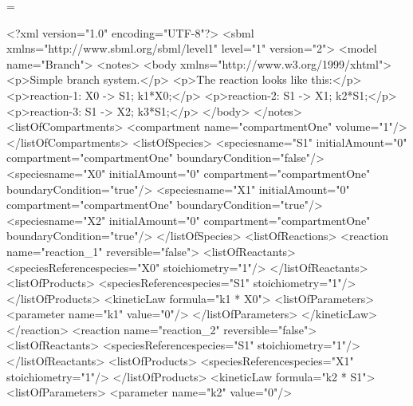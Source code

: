 \documentclass[10pt]{cekarticle}
\makeatletter
\let\realnormalsize=\normalsize
\def\liih@math{\ifmmode$\else\bad@math\fi}
\def\adjustnormalsize{\def\normalsize{\mathsurround=0pt \realnormalsize
 \parindent=0pt\abovedisplayskip=0pt\belowdisplayskip=0pt}%
 \def\phantompar{\csname par\endcsname}\normalsize}%
\newcommand\lthtmlvboxmathA{\adjustnormalsize\setbox\sizebox=\vbox\bgroup %
 \let\ifinner=\iffalse \let\)\liih@math }%
\newcommand\lthtmlmathtype[1]{\gdef\lthtmlmathenv{#1}}%
\newcommand\lthtmlfigureA[1]{\let\@savefreelist\@freelist
       \lthtmlmathtype{#1}\lthtmlvboxmathA}%
\makeatother
\begin{document}
{\newpage\clearpage
\lthtmlfigureA{example889}%
\begin{example}
<?xml version="1.0" encoding="UTF-8"?>
<sbml xmlns="http://www.sbml.org/sbml/level1" level="1" version="\textcolor{BrickRed}{2}">
    <model name="Branch">
        <notes>
            <body xmlns="http://www.w3.org/1999/xhtml">
                <p>Simple branch system.</p>
                <p>The reaction looks like this:</p>
                <p>reaction-1:   X0 -> S1; k1*X0;</p>
                <p>reaction-2:   S1 -> X1; k2*S1;</p>
                <p>reaction-3:   S1 -> X2; k3*S1;</p>
            </body>
        </notes>
        <listOfCompartments>
            <compartment name="compartmentOne" volume="1"/>
        </listOfCompartments>
        <listOfSpecies>
            <\textcolor{BrickRed}{species}name="S1" initialAmount="0" compartment="compartmentOne"
                     boundaryCondition="false"/>
            <\textcolor{BrickRed}{species}name="X0" initialAmount="0" compartment="compartmentOne"
                     boundaryCondition="true"/>
            <\textcolor{BrickRed}{species}name="X1" initialAmount="0" compartment="compartmentOne"
                     boundaryCondition="true"/>
            <\textcolor{BrickRed}{species}name="X2" initialAmount="0" compartment="compartmentOne"
                     boundaryCondition="true"/>
        </listOfSpecies>
        <listOfReactions>
            <reaction name="reaction_1" reversible="false">
                <listOfReactants>
                    <\textcolor{BrickRed}{speciesReference}\textcolor{BrickRed}{species=}"X0" stoichiometry="1"/>
                </listOfReactants>
                <listOfProducts>
                    <\textcolor{BrickRed}{speciesReference}\textcolor{BrickRed}{species=}"S1" stoichiometry="1"/>
                </listOfProducts>
                <kineticLaw formula="k1 * X0">
                    <listOfParameters>
                        <parameter name="k1" value="0"/>
                    </listOfParameters>
                </kineticLaw>
            </reaction>
            <reaction name="reaction_2" reversible="false">
                <listOfReactants>
                    <\textcolor{BrickRed}{speciesReference}\textcolor{BrickRed}{species=}"S1" stoichiometry="1"/>
                </listOfReactants>
                <listOfProducts>
                    <\textcolor{BrickRed}{speciesReference}\textcolor{BrickRed}{species=}"X1" stoichiometry="1"/>
                </listOfProducts>
                <kineticLaw formula="k2 * S1">
                    <listOfParameters>
                        <parameter name="k2" value="0"/>

\end{example}}
\end{document}
